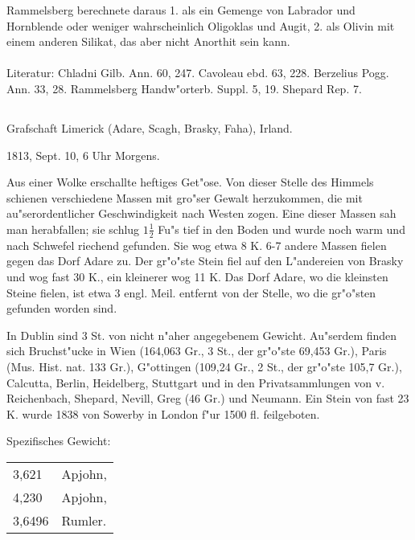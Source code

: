 \documentclass[a4paper, 11pt, oneside]{article}
\begin{document}
Rammelsberg berechnete daraus 1. als ein Gemenge von Labrador und Hornblende oder weniger wahrscheinlich Oligoklas und Augit, 2. als Olivin mit einem anderen Silikat, das aber nicht Anorthit sein kann.
\normalsize
\paragraph{}
Literatur: Chladni Gilb. Ann. 60, 247. Cavoleau ebd. 63, 228. Berzelius Pogg. Ann. 33, 28. Rammelsberg Handw"orterb. Suppl. 5, 19. Shepard Rep. 7.
\subsection{}
\LARGE
\paragraph{}
Grafschaft Limerick (Adare, Scagh, Brasky, Faha), Irland.

1813, Sept. 10, 6 Uhr Morgens.

Aus einer Wolke erschallte heftiges Get"ose. Von dieser Stelle des Himmels schienen verschiedene Massen mit gro"ser Gewalt herzukommen, die mit au"serordentlicher Geschwindigkeit nach Westen zogen. Eine dieser Massen sah man herabfallen; sie schlug $\mathfrak{1\frac{1}{2}}$ Fu"s tief in den Boden und wurde noch warm und nach Schwefel riechend gefunden. Sie wog etwa 8 K. 6-7 andere Massen fielen gegen das Dorf Adare zu. Der gr"o"ste Stein fiel auf den L"andereien von Brasky und wog fast 30 K., ein kleinerer wog 11 K. Das Dorf Adare, wo die kleinsten Steine fielen, ist etwa 3 engl. Meil. entfernt von der Stelle, wo die gr"o"sten gefunden worden sind.

In Dublin sind 3 St. von nicht n"aher angegebenem Gewicht. Au"serdem finden sich Bruchst"ucke in Wien (164,063 Gr., 3 St., der gr"o"ste 69,453 Gr.), Paris (Mus. Hist. nat. 133 Gr.), G"ottingen (109,24 Gr., 2 St., der gr"o"ste 105,7 Gr.), Calcutta, Berlin, Heidelberg, Stuttgart und in den Privatsammlungen von v. Reichenbach, Shepard, Nevill, Greg (46 Gr.) und Neumann. Ein Stein von fast 23 K. wurde 1838 von Sowerby in London f"ur 1500 fl. feilgeboten.

Spezifisches Gewicht:
\begin{table}[!ht]
    \centering\swabfamily\Large
    \begin{tabular}{l l}
        3,621 & Apjohn,\\
        4,230 & Apjohn,\\
        3,6496 & Rumler.
    \end{tabular}
\end{table}
\end{document}
